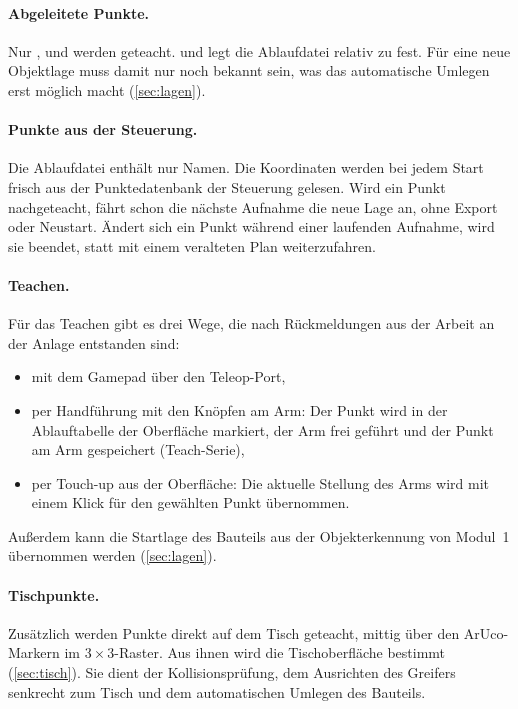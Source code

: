 \paragraph{Abgeleitete Punkte.} Nur ,  und  werden
geteacht.  und  legt die Ablaufdatei relativ zu  fest.
Für eine neue Objektlage muss damit nur noch  bekannt sein, was das automatische
Umlegen erst möglich macht (\cref{sec:lagen}).

\paragraph{Punkte aus der Steuerung.} Die Ablaufdatei enthält nur Namen. Die Koordinaten
werden bei jedem Start frisch aus der Punktedatenbank der Steuerung gelesen. Wird ein Punkt
nachgeteacht, fährt schon die nächste Aufnahme die neue Lage an, ohne Export oder Neustart.
Ändert sich ein Punkt während einer laufenden Aufnahme, wird sie beendet, statt mit einem
veralteten Plan weiterzufahren.

\paragraph{Teachen.} Für das Teachen gibt es drei Wege, die nach Rückmeldungen aus der
Arbeit an der Anlage entstanden sind:
\begin{itemize}
  \item mit dem Gamepad über den Teleop-Port,
  \item per Handführung mit den Knöpfen am Arm: Der Punkt wird in der Ablauftabelle der
    Oberfläche markiert, der Arm frei geführt und der Punkt am Arm gespeichert (Teach-Serie),
  \item per Touch-up aus der Oberfläche: Die aktuelle Stellung des Arms wird mit einem Klick
    für den gewählten Punkt übernommen.
\end{itemize}
Außerdem kann die Startlage des Bauteils aus der Objekterkennung von Modul~1 übernommen
werden (\cref{sec:lagen}).

\paragraph{Tischpunkte.} Zusätzlich werden Punkte direkt auf dem Tisch geteacht, mittig über
den ArUco-Markern im $3 \times 3$-Raster. Aus ihnen wird die Tischoberfläche bestimmt
(\cref{sec:tisch}). Sie dient der Kollisionsprüfung, dem Ausrichten des Greifers senkrecht
zum Tisch und dem automatischen Umlegen des Bauteils.


